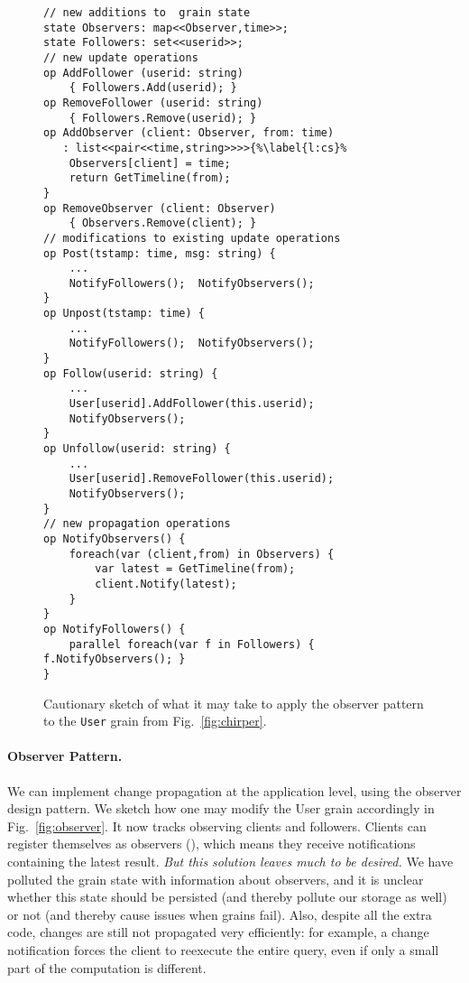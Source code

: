 \begin{figure}
\begin{lstlisting}
// new additions to  grain state
state Observers: map<<Observer,time>>; 
state Followers: set<<userid>>; 	
// new update operations
op AddFollower (userid: string)
	{ Followers.Add(userid); }
op RemoveFollower (userid: string)
	{ Followers.Remove(userid); }
op AddObserver (client: Observer, from: time)
   : list<<pair<<time,string>>>>{%\label{l:cs}%
 	Observers[client] = time; 
 	return GetTimeline(from);
}
op RemoveObserver (client: Observer)
	{ Observers.Remove(client); }
// modifications to existing update operations
op Post(tstamp: time, msg: string) { 
	...
	NotifyFollowers();  NotifyObservers();
} 
op Unpost(tstamp: time) { 
	...
	NotifyFollowers();  NotifyObservers();
}
op Follow(userid: string) {  
	... 
	User[userid].AddFollower(this.userid);
	NotifyObservers();
}
op Unfollow(userid: string) { 
	...  
	User[userid].RemoveFollower(this.userid);
	NotifyObservers(); 
}
// new propagation operations
op NotifyObservers() {
	foreach(var (client,from) in Observers) {
		var latest = GetTimeline(from);
		client.Notify(latest);
	}
}
op NotifyFollowers() {
	parallel foreach(var f in Followers) { f.NotifyObservers(); }
}
\end{lstlisting}
\caption{Cautionary sketch of what it may take to apply the observer pattern to the \lstinline|User| grain from Fig.~\ref{fig:chirper}.}\label{fig:observers}
\end{figure}

\paragraph{Observer Pattern.} We can implement change propagation at the application level, using the observer design pattern. We sketch how one may modify the User grain accordingly in Fig.~\ref{fig:observer}. It now tracks observing clients and followers. Clients can register themselves as observers (), which means they receive notifications containing the latest result. \emph{But this solution leaves much to be desired. } We have polluted the grain state with information about observers, and it is unclear whether this state should be persisted (and thereby pollute our storage as well) or not (and thereby cause issues when grains fail). Also, despite all the extra code, changes are still not propagated very efficiently: for example, a change notification forces the client to reexecute the entire query, even if only a small part of the computation is different.

